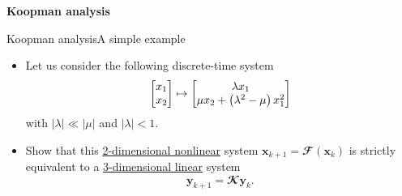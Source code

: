 \documentclass[usenames,dvipsnames,svgnames,10pt,aspectratio=169]{beamer}
\begin{document}
\begin{frame}[t, c]{}
	\centering
	\vspace{1cm}

	{\Large \textbf{Koopman analysis}}

	\bigskip

	{}

\end{frame}

\begin{frame}[t, c]{Koopman analysis}{A simple example}
	\begin{itemize}
		\item Let us consider the following discrete-time system
		\begin{equation}
			\begin{bmatrix} x_1 \\ x_2 \end{bmatrix} \mapsto \begin{bmatrix} \lambda x_1 \\ \mu x_2 + \left( \lambda^2 - \mu \right) x_1^2 \end{bmatrix}
			\notag
		\end{equation}
		with $\vert \lambda \vert \ll \vert \mu \vert$ and $\vert \lambda \vert < 1$.

		\bigskip

		\item Show that this \underline{2-dimensional nonlinear} system $\mathbf{x}_{k+1} = \mathbfcal{F} \left( \mathbf{x}_k \right)$ is strictly equivalent to a \underline{3-dimensional linear} system
		$$\mathbf{y}_{k+1} = \mathbfcal{K} \mathbf{y}_k.$$
	\end{itemize}

	\vspace{1cm}
\end{frame}
\end{document}
